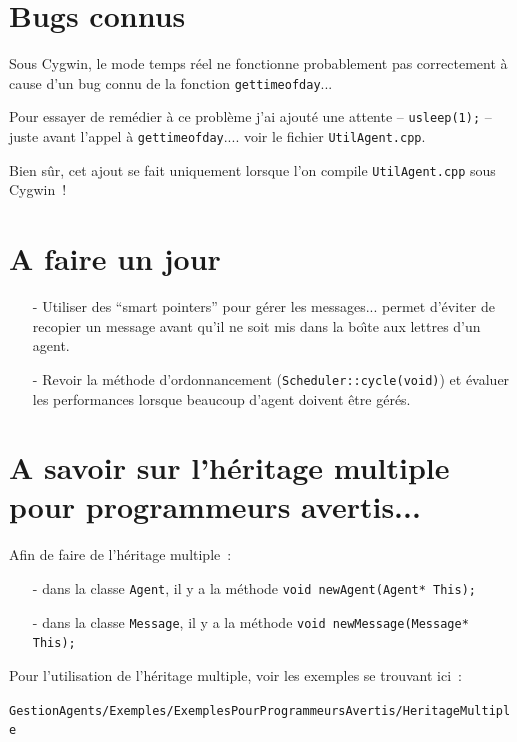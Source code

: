 \documentclass[12pt]{article}
\begin{document}
\section{Bugs connus}

Sous Cygwin, le mode temps r\'eel ne fonctionne probablement pas
correctement \`a cause d'un bug connu de la fonction
{\tt gettimeofday}...

Pour essayer de rem\'edier \`a ce probl\`eme j'ai ajout\'e
une attente -- {\tt usleep(1);} -- juste avant l'appel
\`a {\tt gettimeofday}.... voir le fichier {\tt UtilAgent.cpp}.

Bien s\^ur, cet ajout se fait uniquement lorsque l'on compile
{\tt UtilAgent.cpp} sous Cygwin~!

\section{A faire un jour}

\begin{itemize}
\item[-] Utiliser des ``smart pointers'' pour g\'erer les messages...
permet d'\'eviter de recopier un message avant qu'il ne soit
mis dans la bo\^ \i te aux lettres d'un agent.
\item[-] Revoir la m\'ethode d'ordonnancement
({\tt Scheduler::cycle(void)}) et \'evaluer les performances lorsque
beaucoup d'agent doivent \^etre g\'er\'es.
\end{itemize}

\section{A savoir sur l'h\'eritage multiple\\
pour programmeurs avertis...}

Afin de faire de l'h\'eritage multiple~:
\begin{itemize}
\item[-] dans la classe {\tt Agent}, il y a la m\'ethode
{\tt void newAgent(Agent* This);}
\vspace{-0.3cm}
\item[-] dans la classe {\tt Message}, il y a la m\'ethode
{\tt void newMessage(Message* This);}
\end{itemize}

Pour l'utilisation de l'h\'eritage multiple,
voir les exemples se trouvant ici~:
\begin{center}
{\tt GestionAgents/Exemples/ExemplesPourProgrammeursAvertis/HeritageMultiple}
\end{center}
\end{document}
